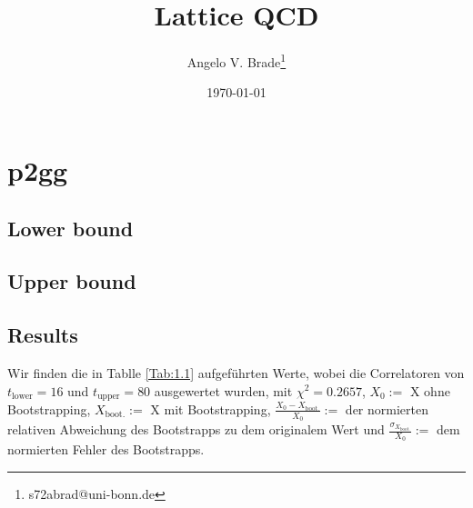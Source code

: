 \documentclass[10pt]{article}
\title{Lattice QCD}
\author[1]{Angelo V. Brade\thanks{s72abrad@uni-bonn.de}}
\affil[1]{Rheinische Friedrich-Wilhelms-Universität Bonn}
\date{\today}
\newenvironment{Figure}
  {\par\medskip\noindent\minipage{\linewidth}}
  {\endminipage\par\medskip}
\begin{document}
\maketitle
\newpage

\tableofcontents
\newpage


\pagestyle{fancy}
\fancyhead[R]{\thepage}
\fancyhead[L]{\leftmark}



\section{p2gg}
\subsection{Lower bound}
\begin{Figure}
  \centering\resizebox{\textwidth}{!}{}
  \label{fig:1.1}
\end{Figure}


\subsection{Upper bound}
\begin{Figure}
  \centering\resizebox{\textwidth}{!}{}
  \label{fig:1.2}

\subsection{Results}
\end{Figure}
\begin{Figure}
  \centering\resizebox{\textwidth}{!}{}
  \label{fig:1.3}
\end{Figure}

Wir finden die in Tablle \ref{Tab:1.1} aufgeführten Werte, wobei die Correlatoren von \(t_\text{lower}=16\) und \(t_\text{upper}=80\) ausgewertet wurden, mit \(\chi^2=0.2657\), \(X_0:=\) X ohne Bootstrapping, \(X_\text{boot.}:=\) X mit Bootstrapping, \(\frac{X_0 - X_\text{boot.}}{X_0}:=\) der normierten relativen Abweichung des Bootstrapps zu dem originalem Wert und \(\frac{\sigma_{X_\text{boot.}}}{X_0}:=\) dem normierten Fehler des Bootstrapps.
\end{document}
